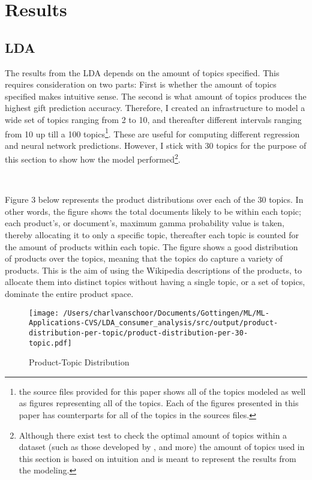 \section{Results} %
\label{sec:results}

 

\subsection{LDA} %
\label{sub:lda}

The results from the LDA depends on the amount of topics specified. This requires consideration on two parts: First is whether the amount of topics specified makes intuitive sense. The second is what amount of topics produces the highest gift prediction accuracy. Therefore, I created an infrastructure to model a wide set of topics ranging from 2 to 10, and thereafter different intervals ranging from 10 up till a 100 topics\footnote{the source files provided for this paper shows all of the topics modeled as well as figures representing all of the topics. Each of the figures presented in this paper has counterparts for all of the topics in the sources files.}. These  are useful for computing different regression and neural network predictions. However, I stick with 30 topics for the purpose of this section to show how the model performed\footnote{Although there exist test to check the optimal amount of topics within a dataset (such as those developed by \cite{arun2010finding}, \cite{griffiths2004finding} and more) the amount of topics used in this section is based on intuition and is meant to represent the results from the modeling.}. 

\

Figure 3 below represents the product distributions over each of the 30 topics. In other words, the figure shows the total documents likely to be within each topic; each product's, or document's, maximum gamma probability value is taken, thereby allocating it to only a specific topic, thereafter each topic is counted for the amount of products within each topic. The figure shows a good distribution of products over the topics, meaning that the topics do capture a variety of products. This is the aim of using the Wikipedia descriptions of the products, to allocate them into distinct topics without having a single topic, or a set of topics, dominate the entire product space. 


\begin{figure}[!h]
\caption{Product-Topic Distribution}\centering
\texttt{[image: /Users/charlvanschoor/Documents/Gottingen/ML/ML-Applications-CVS/LDA\_consumer\_analysis/src/output/product-distribution-per-topic/product-distribution-per-30-topic.pdf]}
\end{figure}



